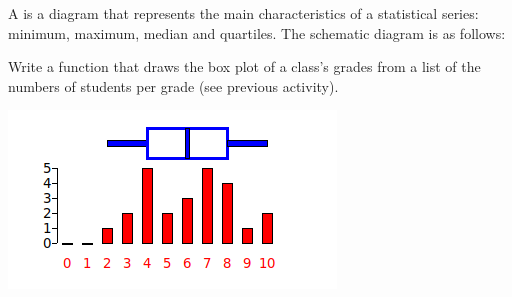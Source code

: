 \documentclass[11pt,class=report,crop=false]{standalone}
\begin{document}
\begin{activite}


A  is a diagram that represents the main characteristics of a statistical series: minimum, maximum, median and quartiles. The schematic diagram is as follows:


Write a  function that draws the box plot of a class's grades from a list of the numbers of students per grade (see previous activity).

\begin{center}
\includegraphics[scale=\myscale,scale=0.7]{screen-stat-4-en}
\end{center}

	
\end{activite}



\end{document}
